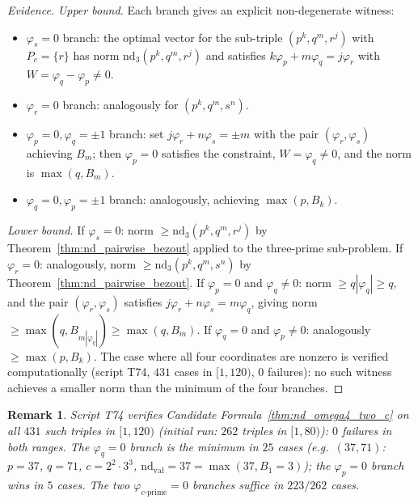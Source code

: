 \documentclass[12pt]{article}
\newtheorem{remark}{Remark}
\theoremstyle{definition}
\begin{document}
\begin{proof}[Evidence]
  \textit{Upper bound.}
  Each branch gives an explicit non-degenerate witness:
  \begin{itemize}
    \item $\varphi_s = 0$ branch: the optimal vector for the sub-triple
      $(p^k, q^m, r^j)$ with $P_c = \{r\}$ has norm
      $\mathrm{nd}_{3}(p^k, q^m, r^j)$ and satisfies $k\varphi_p + m\varphi_q = j\varphi_r$
      with $W = \varphi_q - \varphi_p \ne 0$.
    \item $\varphi_r = 0$ branch: analogously for $(p^k, q^m, s^n)$.
    \item $\varphi_p = 0, \varphi_q = \pm 1$ branch: set $j\varphi_r + n\varphi_s = \pm m$
      with the pair $(\varphi_r, \varphi_s)$ achieving $B_m$; then
      $\varphi_p = 0$ satisfies the constraint, $W = \varphi_q \ne 0$, and
      the norm is $\max(q, B_m)$.
    \item $\varphi_q = 0, \varphi_p = \pm 1$ branch: analogously, achieving $\max(p, B_k)$.
  \end{itemize}
  \textit{Lower bound.}
  If $\varphi_s = 0$: norm $\ge \mathrm{nd}_{3}(p^k, q^m, r^j)$ by
  Theorem~\ref{thm:nd_pairwise_bezout} applied to the three-prime sub-problem.
  If $\varphi_r = 0$: analogously, norm $\ge \mathrm{nd}_{3}(p^k, q^m, s^n)$ by
  Theorem~\ref{thm:nd_pairwise_bezout}.
  If $\varphi_p = 0$ and $\varphi_q \ne 0$: norm $\ge q|\varphi_q| \ge q$, and the
  pair $(\varphi_r, \varphi_s)$ satisfies $j\varphi_r + n\varphi_s = m\varphi_q$,
  giving norm $\ge \max(q, B_{m|\varphi_q|}) \ge \max(q, B_m)$.
  If $\varphi_q = 0$ and $\varphi_p \ne 0$: analogously $\ge \max(p, B_k)$.
  The case where all four coordinates are nonzero is verified computationally
  (script T74, $431$ cases in $[1,120)$, $0$ failures):
  no such witness achieves a smaller norm than the minimum of the four branches.
\end{proof}

\begin{remark}
  Script T74 verifies Candidate Formula~\ref{thm:nd_omega4_two_c} on all $431$ such triples
  in $[1,120)$ (initial run: $262$ triples in $[1,80)$): $0$ failures in both ranges.
  The $\varphi_q=0$ branch is the minimum in $25$ cases
  (e.g.\ $(37, 71)$: $p=37$, $q=71$, $c = 2^2 \cdot 3^3$, $\mathrm{nd}_{\mathrm{val}}=37 = \max(37, B_1=3)$);
  the $\varphi_p=0$ branch wins in $5$ cases.
  The two $\varphi_{c\text{-prime}}=0$ branches suffice in $223/262$ cases.
\end{remark}
\end{document}
